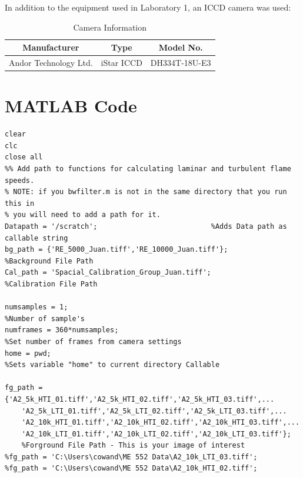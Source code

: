 \documentclass[12pt]{ussci} %
\begin{document}
\begin{appendices}
In addition to the equipment used in Laboratory 1, an ICCD camera was used:

\begin{table}[h]
\begin{center}
\begin{tabular}{ | c  c  c |}
 \hline
 Manufacturer & Type & Model No. \\
 \hline
 Andor Technology Ltd. & iStar ICCD & DH334T-18U-E3 \\
 \hline
\end{tabular}
\end{center}
\caption{Camera Information}\label{tab:camera}
\end{table}




\clearpage


\section{MATLAB Code}\label{app:Code}

\begingroup
\fontsize{9pt}{12pt}\selectfont
\begin{verbatim}
clear
clc
close all
%% Add path to functions for calculating laminar and turbulent flame speeds.
% NOTE: if you bwfilter.m is not in the same directory that you run this in
% you will need to add a path for it.
Datapath = '/scratch';                           %Adds Data path as callable string
bg_path = {'RE_5000_Juan.tiff','RE_10000_Juan.tiff'};                         
%Background File Path
Cal_path = 'Spacial_Calibration_Group_Juan.tiff';                       
%Calibration File Path

numsamples = 1;                                                                 
%Number of sample's
numframes = 360*numsamples;                                                     
%Set number of frames from camera settings
home = pwd;                                                                    
%Sets variable "home" to current directory Callable

fg_path = {'A2_5k_HTI_01.tiff','A2_5k_HTI_02.tiff','A2_5k_HTI_03.tiff',...
    'A2_5k_LTI_01.tiff','A2_5k_LTI_02.tiff','A2_5k_LTI_03.tiff',...
    'A2_10k_HTI_01.tiff','A2_10k_HTI_02.tiff','A2_10k_HTI_03.tiff',...
    'A2_10k_LTI_01.tiff','A2_10k_LTI_02.tiff','A2_10k_LTI_03.tiff'};          
    %Forground File Path - This is your image of interest
%fg_path = 'C:\Users\cowand\ME 552 Data\A2_10k_LTI_03.tiff';
%fg_path = 'C:\Users\cowand\ME 552 Data\A2_10k_HTI_02.tiff';


\end{verbatim}
\end{appendices}
\end{document}
